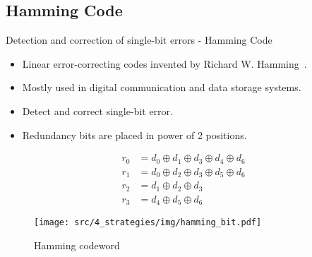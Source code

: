 \subsection{Hamming Code}
    \begin{frame}{Detection and correction of single-bit errors - Hamming Code}
        \begin{block}{}
            \begin{itemize}
                \justifying
                \item Linear error-correcting codes invented by Richard W. Hamming~\cite{H-50-bstj}.
                \item Mostly used in digital communication and data storage systems.
                \item Detect and correct single-bit error.
                \item Redundancy bits are placed in power of 2 positions.
            \end{itemize}
        \end{block}

        \begin{minipage}[c]{0.4\linewidth}
            \begin{equation} \label{equat:hamming_encoder}
                \begin{split}
                    r_{0} &= d_{0} \oplus d_{1} \oplus d_{3} \oplus d_{4} \oplus d_{6} \\
                    r_{1} &= d_{0} \oplus d_{2} \oplus d_{3} \oplus d_{5} \oplus d_{6} \\
                    r_{2} &= d_{1} \oplus d_{2} \oplus d_{3} \\
                    r_{3} &= d_{4} \oplus d_{5} \oplus d_{6}
                \end{split}
            \end{equation}
        \end{minipage}\hfill%
        \begin{minipage}[c]{0.55\linewidth}
            \begin{figure}
                \centering
                \texttt{[image: src/4\_strategies/img/hamming\_bit.pdf]}
                \caption{Hamming codeword}
                \label{fig:hamming_codeword}
            \end{figure}
        \end{minipage}
    \end{frame}
    
